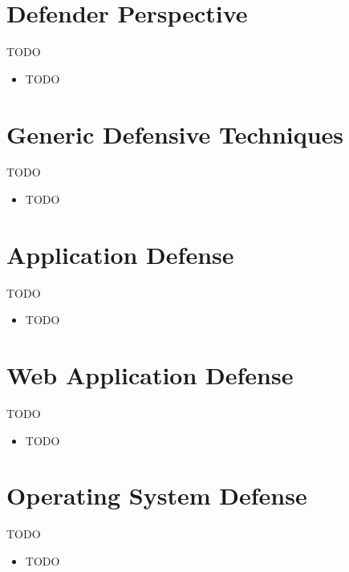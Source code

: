 \documentclass{curs}
\begin{document}
\section{Defender Perspective}

\begin{frame}{TODO}
  \begin{itemize}
    \item TODO
  \end{itemize}
\end{frame}


\section{Generic Defensive Techniques}

\begin{frame}{TODO}
  \begin{itemize}
    \item TODO
  \end{itemize}
\end{frame}


\section{Application Defense}

\begin{frame}{TODO}
  \begin{itemize}
    \item TODO
  \end{itemize}
\end{frame}


\section{Web Application Defense}

\begin{frame}{TODO}
  \begin{itemize}
    \item TODO
  \end{itemize}
\end{frame}


\section{Operating System Defense}

\begin{frame}{TODO}
  \begin{itemize}
    \item TODO
  \end{itemize}
\end{frame}
\end{document}

